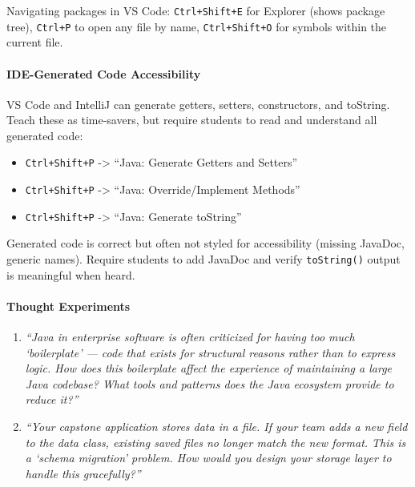\documentclass[
  justified,
  openright,
]{tufte-book}
\let\subsubsection\paragraph
\let\paragraph\paragraph
\let\subsubsection\paragraph
\let\paragraph\paragraph
\providecommand{\tightlist}{%
  \setlength{\itemsep}{0pt}\setlength{\parskip}{0pt}}
\begin{document}
Navigating packages in VS Code: \texttt{Ctrl+Shift+E} for Explorer
(shows package tree), \texttt{Ctrl+P} to open any file by name,
\texttt{Ctrl+Shift+O} for symbols within the current file.

\subsubsection{IDE-Generated Code
Accessibility}\label{ide-generated-code-accessibility}

VS Code and IntelliJ can generate getters, setters, constructors, and
toString. Teach these as time-savers, but require students to read and
understand all generated code:

\begin{itemize}
\tightlist
\item
  \texttt{Ctrl+Shift+P} -\textgreater{} ``Java: Generate Getters and
  Setters''
\item
  \texttt{Ctrl+Shift+P} -\textgreater{} ``Java: Override/Implement
  Methods''
\item
  \texttt{Ctrl+Shift+P} -\textgreater{} ``Java: Generate toString''
\end{itemize}

Generated code is correct but often not styled for accessibility
(missing JavaDoc, generic names). Require students to add JavaDoc and
verify \texttt{toString()} output is meaningful when heard.

\paragraph{Thought Experiments}\label{thought-experiments-12}

\begin{enumerate}
\def\labelenumi{\arabic{enumi}.}
\item
  \emph{``Java in enterprise software is often criticized for having too
  much `boilerplate' --- code that exists for structural reasons rather
  than to express logic. How does this boilerplate affect the experience
  of maintaining a large Java codebase? What tools and patterns does the
  Java ecosystem provide to reduce it?''}
\item
  \emph{``Your capstone application stores data in a file. If your team
  adds a new field to the data class, existing saved files no longer
  match the new format. This is a `schema migration' problem. How would
  you design your storage layer to handle this gracefully?''}
\end{enumerate}
\end{document}
